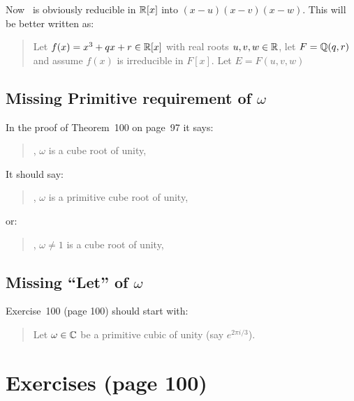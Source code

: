 Now \fx\ is obviously reducible in \(\mathbb{R}[x]\) into \((x-u)(x-v)(x-w)\).
This will be better written as:

\begin{quotation}
  \setcounter{quotethm}{101} %
  \begin{quotethm}
  Let \(f(x) = x^3+qx+r\in \mathbb{R}[x]\) with real roots \(u,v,w\in \mathbb{R}\),
  let \(F=\mathbb{Q}(q,r)\) and assume \(f(x)\) is irreducible in \(F[x]\).
  Let \(E=F(u,v,w)\) \mldots
  \end{quotethm}
\end{quotation}



\subsection[Missing Primitive requirement]{
            Missing Primitive requirement of \(\omega\)}

In the proof of Theorem~100 on page~97 it says:
\begin{quotation}
\mldots, \(\omega\) is a cube root of unity, \mldots
\end{quotation}
It should say:
\begin{quotation}
\mldots, \(\omega\) is a primitive cube root of unity, \mldots
\end{quotation}
or:
\begin{quotation}
\mldots, \(\omega\neq 1\) is a cube root of unity, \mldots
\end{quotation}


\subsection{Missing ``Let'' of \ensuremath{\omega}}


Exercise~100 (page 100) should start with:
\begin{quotation}
Let \(\omega\in \mathbb{C}\) be a primitive cubic of unity (say \(e^{2\pi i/3}\)).
\end{quotation}


\section{Exercises (page 100)}

